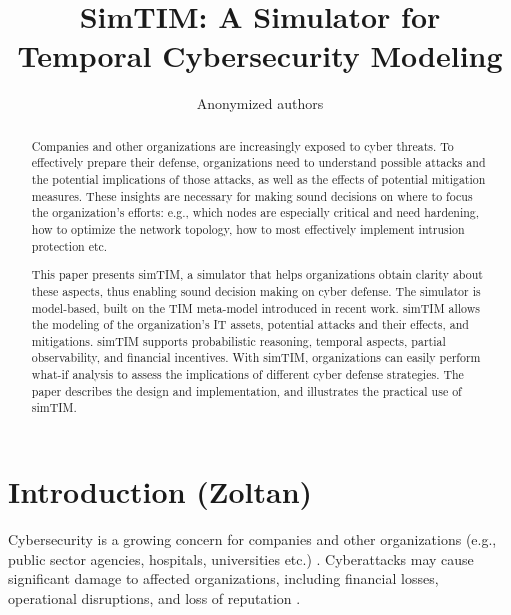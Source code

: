 \documentclass{llncs}
\begin{document}
\title{SimTIM: A Simulator for Temporal Cybersecurity Modeling}
\author{Anonymized authors}

\maketitle

\begin{abstract}
Companies and other organizations are increasingly exposed to cyber threats.
To effectively prepare their defense, organizations need to understand possible attacks and the potential implications of those attacks, as well as the effects of potential mitigation measures.
These insights are necessary for making sound decisions on where to focus the organization's efforts: e.g., which nodes are especially critical and need hardening, how to optimize the network topology, how to most effectively implement intrusion protection etc.

This paper presents simTIM, a simulator that helps organizations obtain clarity about these aspects, thus enabling sound decision making on cyber defense.
The simulator is model-based, built on the TIM meta-model introduced in recent work.
simTIM allows the modeling of the organization's IT assets, potential attacks and their effects, and mitigations.
simTIM supports probabilistic reasoning, temporal aspects, partial observability, and financial incentives.
With simTIM, organizations can easily perform what-if analysis to assess the implications of different cyber defense strategies.
The paper describes the design and implementation, and illustrates the practical use of simTIM.
\end{abstract}


\section{Introduction (Zoltan)}

Cybersecurity is a growing concern for companies and other organizations (e.g., public sector agencies, hospitals, universities etc.) \cite{admass2024cyber}.
Cyberattacks may cause significant damage to affected organizations, including financial losses, operational disruptions, and loss of reputation \cite{woods2021sok}.
\end{document}
